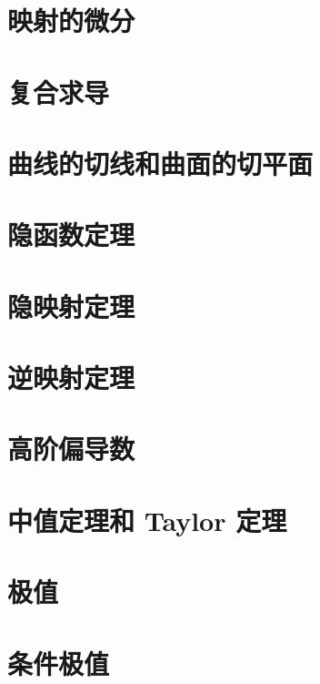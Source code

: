 \documentclass[a4paper, 11pt]{ctexbook}
\begin{document}
        \section{映射的微分}
        \section{复合求导}
        \section{曲线的切线和曲面的切平面}
        \section{隐函数定理}
        \section{隐映射定理}
        \section{逆映射定理}
        \section{高阶偏导数}
        \section{中值定理和 Taylor 定理}
        \section{极值}
        \section{条件极值}
\end{document}
